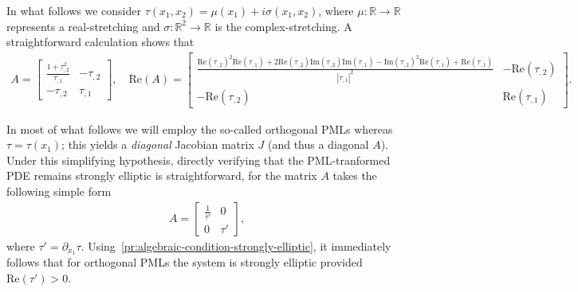 \documentclass[11pt]{article}
\newcommand{\R}{\mathbb{R}}
\begin{document}
In what follows we consider $\tau(x_1,x_2) = \mu(x_1) + i \sigma(x_1,x_2)$,
where $\mu : \R \to \R$ represents a real-stretching and $\sigma : \R^2 \to \R$
is the complex-stretching. A straightforward calculation shows that 
\begin{align}
  A = 
  \begin{bmatrix}
    \frac{1 + \tau_{,2}^2}{\tau_{,1}} & -\tau_{,2} \\
    -\tau_{,2} & \tau_{,1}
  \end{bmatrix}, \quad
  \mathrm{Re}(A) = 
  \begin{bmatrix}
    \frac{\mathrm{Re}(\tau_{,2})^2 \mathrm{Re}(\tau_{,1}) + 2 \mathrm{Re}(\tau_{,2}) \mathrm{Im}(\tau_{,2}) \mathrm{Im}(\tau_{,1}) - \mathrm{Im}(\tau_{,2}) ^2 \mathrm{Re}(\tau_{,1}) + \mathrm{Re}(\tau_{,1})}{|\tau_{,1}|^2} & -\mathrm{Re}(\tau_{,2}) \\
    -\mathrm{Re}(\tau_{,2}) & \mathrm{Re}(\tau_{,1})
  \end{bmatrix}.
\end{align}


In most of what follows we will employ the so-called orthogonal PMLs whereas
$\tau = \tau(x_1)$; this yields a \emph{diagonal} Jacobian matrix $J$ (and thus
a diagonal $A$). Under this simplifying hypothesis, directly verifying that the
PML-tranformed PDE remains strongly elliptic is straightforward, for the matrix
$A$ takes the following simple form
\begin{align}
    A =
    \begin{bmatrix}
      \frac{1}{\tau'} & 0 \\
      0 & \tau'
    \end{bmatrix},
\end{align}
where $\tau' = \partial_{x_1} \tau$.
Using~\cref{pr:algebraic-condition-strongly-elliptic}, it immediately follows
that for orthogonal PMLs the system is strongly elliptic provided
$\mathrm{Re}(\tau') > 0$. 
\end{document}
